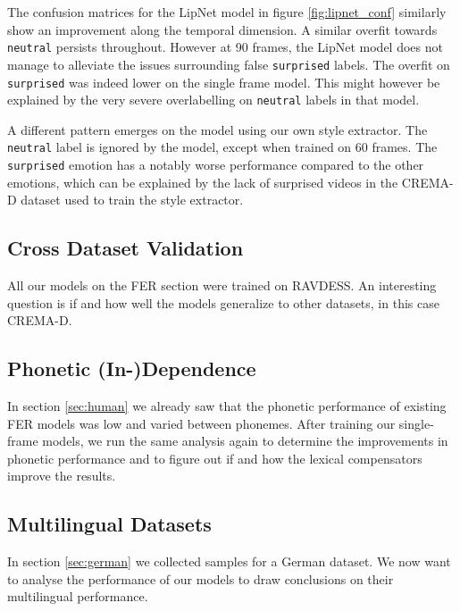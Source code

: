 The confusion matrices for the LipNet model in figure \ref{fig:lipnet_conf} similarly show an improvement along the temporal dimension. A similar overfit towards \texttt{neutral} persists throughout. However at 90 frames, the LipNet model does not manage to alleviate the issues surrounding false \texttt{surprised} labels. The overfit on \texttt{surprised} was indeed lower on the single frame model. This might however be explained by the very severe overlabelling on \texttt{neutral} labels in that model.

A different pattern emerges on the model using our own style extractor. The \texttt{neutral} label is ignored by the model, except when trained on 60 frames. The \texttt{surprised} emotion has a notably worse performance compared to the other emotions, which can be explained by the lack of surprised videos in the CREMA-D dataset used to train the style extractor.

\subsection{Cross Dataset Validation}
All our models on the FER section were trained on RAVDESS. An interesting question is if and how well the models generalize to other datasets, in this case CREMA-D.

\subsection{Phonetic (In-)Dependence}
In section \ref{sec:human} we already saw that the phonetic performance of existing FER models was low and varied between phonemes. After training our single-frame models, we run the same analysis again to determine the improvements in phonetic performance and to figure out if and how the lexical compensators improve the results.
\subsection{Multilingual Datasets}
In section \ref{sec:german} we collected samples for a German dataset. We now want to analyse the performance of our models to draw conclusions on their multilingual performance.

